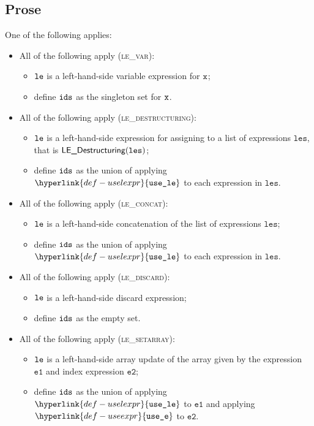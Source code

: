 \documentclass{book}
\newcommand\useexpr[0]{\hyperlink{def-useexpr}{\texttt{use\_e}}}
\newcommand\uselexpr[0]{\hyperlink{def-uselexpr}{\texttt{use\_le}}}
\newcommand\veone[0]{\texttt{e1}}
\newcommand\vetwo[0]{\texttt{e2}}
\newcommand\vles[0]{\texttt{les}}
\begin{document}
\subsection{Prose}
One of the following applies:
\begin{itemize}
  \item All of the following apply (\textsc{le\_var}):
  \begin{itemize}
    \item $\texttt{le}$ is a left-hand-side variable expression for $\texttt{x}$;
    \item define $\texttt{ids}$ as the singleton set for $\texttt{x}$.
  \end{itemize}

  \item All of the following apply (\textsc{le\_destructuring}):
  \begin{itemize}
    \item $\texttt{le}$ is a left-hand-side expression for assigning to a list of expressions $\vles$,
          that is $\LEDestructuring(\vles)$;
    \item define $\texttt{ids}$ as the union of applying $\uselexpr$ to each expression in $\vles$.
  \end{itemize}

  \item All of the following apply (\textsc{le\_concat}):
  \begin{itemize}
    \item $\texttt{le}$ is a left-hand-side concatenation of the list of expressions $\vles$;
    \item define $\texttt{ids}$ as the union of applying $\uselexpr$ to each expression in $\vles$.
  \end{itemize}

  \item All of the following apply (\textsc{le\_discard}):
  \begin{itemize}
    \item $\texttt{le}$ is a left-hand-side discard expression;
    \item define $\texttt{ids}$ as the empty set.
  \end{itemize}

  \item All of the following apply (\textsc{le\_setarray}):
  \begin{itemize}
    \item $\texttt{le}$ is a left-hand-side array update of the array given by the expression $\veone$ and index expression $\vetwo$;
    \item define $\texttt{ids}$ as the union of applying $\uselexpr$ to $\veone$ and applying $\useexpr$ to $\vetwo$.
  \end{itemize}


\end{itemize}
\end{document}
